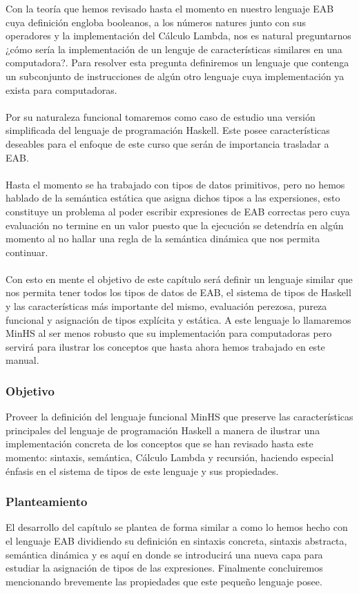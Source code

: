 Con la teoría que hemos revisado hasta el momento en nuestro lenguaje \textsf{EAB} cuya definición engloba booleanos, a los números natures junto con sus operadores y la implementación del Cálculo Lambda, nos es natural preguntarnos  ¿cómo sería la implementación de un lenguje de características similares en una computadora?. Para resolver esta pregunta definiremos un lenguaje que contenga un subconjunto de instrucciones de algún otro lenguaje cuya implementación ya exista para computadoras.  \\\\
Por su naturaleza funcional tomaremos como caso de estudio una versión simplificada del lenguaje de programación \textsf{Haskell}. Este posee características deseables para el enfoque de este curso que serán de importancia trasladar a \textsf{EAB}. \\\\
Hasta el momento se ha trabajado con tipos de datos primitivos, pero no hemos hablado de la semántica estática que asigna dichos tipos a las expersiones, esto constituye un problema al poder escribir expresiones de \textsf{EAB} correctas pero cuya evaluación no termine en un valor puesto que la ejecución se detendría en algún momento al no hallar una regla de la semántica dinámica que nos permita continuar. \\\\
Con esto en mente el objetivo de este capítulo será definir un lenguaje similar que nos permita tener todos los tipos de datos de \textsf{EAB}, el sistema de tipos de \textsf{Haskell} y las características más importante del mismo, evaluación perezosa, pureza funcional y asignación de tipos explícita y estática. 
A este lenguaje lo llamaremos \textsf{MinHS} al ser menos robusto que su implementación para computadoras pero servirá para ilustrar los conceptos que hasta ahora hemos trabajado en este manual.

\subsubsection{Objetivo}
Proveer la definición del lenguaje funcional \textsf{MinHS} que preserve las características principales del lenguaje de programación \textsf{Haskell} a manera de ilustrar una implementación concreta de los conceptos que se han revisado hasta este momento: sintaxis, semántica, Cálculo Lambda y recursión, haciendo especial énfasis en el sistema de tipos de este lenguaje y sus propiedades.


\subsubsection{Planteamiento}
El desarrollo del capítulo se plantea de forma similar a como lo hemos hecho con el lenguaje \textsf{EAB} dividiendo su definición en sintaxis concreta, sintaxis abstracta, semántica dinámica y es aquí en donde se introducirá una nueva capa para estudiar la asignación de tipos de las expresiones. Finalmente concluiremos mencionando brevemente las propiedades que este pequeño lenguaje posee. \\

